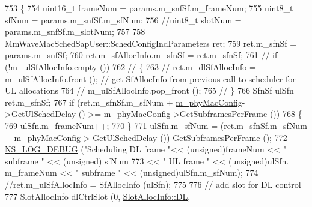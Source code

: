 \begin{DoxyCode}
753 \{
754         uint16\_t frameNum = params.m\_snfSf.m\_frameNum;
755         uint8\_t sfNum = params.m\_snfSf.m\_sfNum;
756         \textcolor{comment}{//uint8\_t slotNum = params.m\_snfSf.m\_slotNum;}
757 
758         MmWaveMacSchedSapUser::SchedConfigIndParameters ret;
759         ret.m\_sfnSf = params.m\_snfSf;
760         ret.m\_sfAllocInfo.m\_sfnSf = ret.m\_sfnSf;
761         \textcolor{comment}{//      if (!m\_ulSfAllocInfo.empty ())}
762         \textcolor{comment}{//      \{}
763         \textcolor{comment}{//              ret.m\_dlSfAllocInfo = m\_ulSfAllocInfo.front ();  // get SfAllocInfo from previous
       call to scheduler for UL allocations}
764         \textcolor{comment}{//              m\_ulSfAllocInfo.pop\_front ();}
765         \textcolor{comment}{//      \}}
766         SfnSf ulSfn = ret.m\_sfnSf;
767         \textcolor{keywordflow}{if} (ret.m\_sfnSf.m\_sfNum + \hyperlink{classns3_1_1MmWaveMacScheduler_a24d7af4971d2e500fe543cefbafa2fd9}{m\_phyMacConfig}->\hyperlink{classns3_1_1MmWavePhyMacCommon_afd70935ec71838fefe6a8e18198f19cb}{GetUlSchedDelay} () >=  
      \hyperlink{classns3_1_1MmWaveMacScheduler_a24d7af4971d2e500fe543cefbafa2fd9}{m\_phyMacConfig}->\hyperlink{classns3_1_1MmWavePhyMacCommon_a3709cf52f6813eb8ad1af16d95082dc1}{GetSubframesPerFrame} ())
768         \{
769                 ulSfn.m\_frameNum++;
770         \}
771         ulSfn.m\_sfNum = (ret.m\_sfnSf.m\_sfNum + \hyperlink{classns3_1_1MmWaveMacScheduler_a24d7af4971d2e500fe543cefbafa2fd9}{m\_phyMacConfig}->
      \hyperlink{classns3_1_1MmWavePhyMacCommon_afd70935ec71838fefe6a8e18198f19cb}{GetUlSchedDelay} ()) %
      \hyperlink{classns3_1_1MmWavePhyMacCommon_a3709cf52f6813eb8ad1af16d95082dc1}{GetSubframesPerFrame} ();
772         \hyperlink{group__logging_ga413f1886406d49f59a6a0a89b77b4d0a}{NS\_LOG\_DEBUG} (\textcolor{stringliteral}{"Scheduling DL frame "}<< (\textcolor{keywordtype}{unsigned})frameNum << \textcolor{stringliteral}{" subframe "} << (\textcolor{keywordtype}{unsigned})
      sfNum
773                                                                 << \textcolor{stringliteral}{" UL frame "} << (\textcolor{keywordtype}{unsigned})ulSfn.
      m\_frameNum << \textcolor{stringliteral}{" subframe "} << (\textcolor{keywordtype}{unsigned})ulSfn.m\_sfNum);
774         \textcolor{comment}{//ret.m\_ulSfAllocInfo = SfAllocInfo (ulSfn);}
775 
776         \textcolor{comment}{// add slot for DL control}
777         SlotAllocInfo dlCtrlSlot (0, \hyperlink{structns3_1_1SlotAllocInfo_a6cad60db1d39034f1851e2cea625fe5da9a365c9c56b7c32dcae38ee1a468ce6d}{SlotAllocInfo::DL}, 

\end{DoxyCode}
